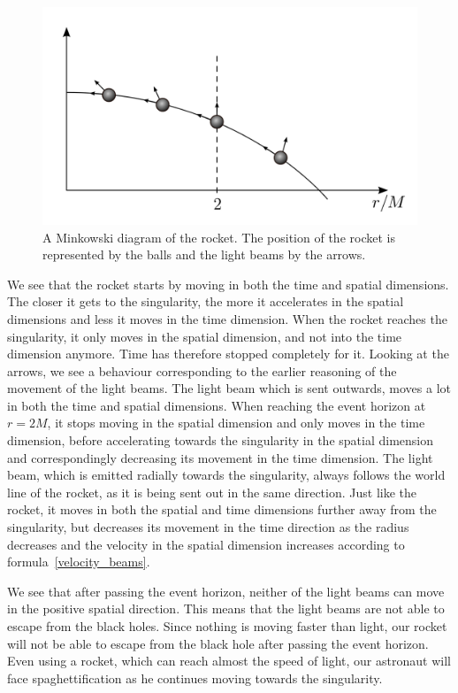 \documentclass[reprint,english,notitlepage]{revtex4-2}
\begin{document}
        \begin{figure}[h]
            \centering
            \includegraphics[scale=0.2]{world_line}
            \caption{A Minkowski diagram of the rocket. The position of the rocket is represented by the balls and the light beams by the arrows.}\label{fig:world_line}
        \end{figure}

        We see that the rocket starts by moving in both the time and spatial dimensions.
        The closer it gets to the singularity, the more it accelerates in the spatial dimensions and less it moves in the time dimension.
        When the rocket reaches the singularity, it only moves in the spatial dimension, and not into the time dimension anymore.
        Time has therefore stopped completely for it.
        Looking at the arrows, we see a behaviour corresponding to the earlier reasoning of the movement of the light beams.
        The light beam which is sent outwards, moves a lot in both the time and spatial dimensions.
        When reaching the event horizon at $r = 2M$, it stops moving in the spatial dimension and only moves in the time dimension, before accelerating towards the singularity in the spatial dimension and correspondingly decreasing its movement in the time dimension.
        The light beam, which is emitted radially towards the singularity, always follows the world line of the rocket, as it is being sent out in the same direction.
        Just like the rocket, it moves in both the spatial and time dimensions further away from the singularity, but decreases its movement in the time direction as the radius decreases and the velocity in the spatial dimension increases according to formula~\eqref{velocity_beams}.

        We see that after passing the event horizon, neither of the light beams can move in the positive spatial direction.
        This means that the light beams are not able to escape from the black holes.
        Since nothing is moving faster than light, our rocket will not be able to escape from the black hole after passing the event horizon.
        Even using a rocket, which can reach almost the speed of light, our astronaut will face spaghettification as he continues moving towards the singularity.
\end{document}
